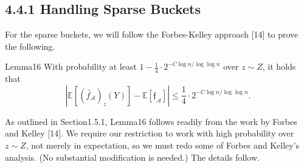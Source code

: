 \subsection*{4.4.1 Handling Sparse Buckets}
For the sparse buckets, we will follow the Forbes-Kelley approach [14] to prove the following.
\begin{authorclaim}{Lemma16}
With probability at least $1-\frac14\cdot2^{-C\log n/\log\log n}$ over $z\sim Z$, it holds that
\[
|\mathbb E[(\widetilde{f_{\mathcal A}})_z(Y)]-\mathbb E[\mathfrak f_{\mathcal A}]|
\le\frac14\cdot2^{-C\log n/\log\log n}.
\]
\end{authorclaim}
As outlined in Section1.5.1, Lemma16 follows readily from the work by Forbes and Kelley [14]. We require our restriction to work with high probability over $z\sim Z$, not merely in expectation, so we must redo some of Forbes and Kelley's analysis. (No substantial modification is needed.) The details follow.
